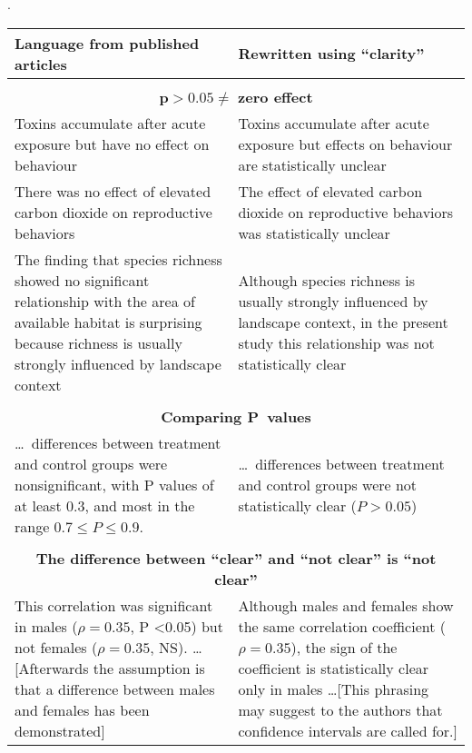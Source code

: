 \setlength\tabcolsep{1cm}.
\begin{tabular}{p{7.0cm}p{7.0cm}}
Language from published articles & Rewritten using ``clarity'' \\
\hline\\

\multicolumn{2}{c}{$\mathbf{p > 0.05 \neq}$ \textbf{zero effect}} \\

Toxins accumulate after acute exposure but have no effect on behaviour
& Toxins accumulate after acute exposure but effects on behaviour are statistically unclear
\\

There was no effect of elevated carbon dioxide on reproductive behaviors 
& The effect of elevated carbon dioxide on reproductive behaviors was statistically unclear
\\

The finding that species richness showed no significant relationship with the area of available habitat is surprising because richness is usually strongly influenced by landscape context 
& Although species richness is usually strongly influenced by landscape context, in the present study this relationship was not statistically clear 
\\ \\

\multicolumn{2}{c}{\textbf{Comparing P~values}}
\\

\ldots\ differences between treatment and control groups were nonsignificant, with P values of at least 0.3, and most in the range $0.7 \leq P \leq 0.9$.
& \ldots\ differences between treatment and control groups were not statistically clear ($P > 0.05$)
\\ \\

\multicolumn{2}{c}{\textbf{The difference between ``clear'' and ``not clear'' is ``not clear''}}
\\

This correlation was significant in males ($\rho=0.35$, P \textless 0.05) but not females ($\rho=0.35$, NS). \ldots [Afterwards the assumption is that a difference between males and females has been demonstrated]
& Although males and females show the same correlation coefficient ($\rho=0.35$), the sign of the coefficient is statistically clear only in males  \ldots [This phrasing may suggest to the authors that confidence intervals are called for.] 
\\


\end{tabular}
